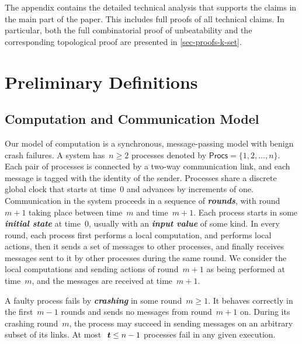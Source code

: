 \documentclass[11pt]{article}
\theoremstyle{definition}
\newcommand{\defemph}[1]{\textbf{\textit{#1}}}
\newcommand{\Proc}{\mathsf{Procs}}
\newcommand{\tee}{\,\defemph{t}}
\begin{document}
The appendix
contains the detailed technical analysis that supports the claims in the main part of the paper. This includes
full proofs of all technical claims. In particular, both the full combinatorial proof of unbeatability and
the corresponding
topological proof are presented in \cref{sec-proofs-k-set}.

\section{Preliminary Definitions}
\label{sec:model}

\subsection{Computation and Communication Model}
\label{sec:model-communication}

Our model of computation is a synchronous, message-passing model with
benign crash failures.
A system has~\mbox{$n\!\ge\!2$} processes denoted by
$\Proc=\{1,2,\ldots,n\}$.
Each pair of processes is connected by a two-way communication link,
and each message is tagged with the identity of the sender.
Processes
share a discrete global clock that starts
at time~$0$ and
advances by increments of one. Communication in the system proceeds in
a sequence of \defemph{rounds}, with round~$m+1$ taking place between
time~$m$ and time~$m+1$.
Each process starts in some \defemph{initial state} at time~$0$,
usually with an \defemph{input value} of some kind.
In every round, each process first performs a local computation, and performs local actions,
then
it sends a set of messages to other processes, and finally receives messages sent to it
by other processes during the same round.
We consider the
local computations and sending actions of round~$m+1$ as being performed at time~$m$,
and the messages are received at time~$m+1$.

A faulty process fails by \defemph{crashing} in some round~$m\ge 1$.
It behaves correctly in the first~$m-1$ rounds and
sends no messages from round~$m+1$ on.
During its crashing round~$m$, the process may succeed in
sending messages on an arbitrary subset of its links.
At most~$\tee \leq n-1$ processes fail in any given execution.
\end{document}
